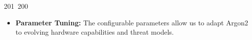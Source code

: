 201~200~\documentclass{article}
\begin{document}
\begin{itemize}
	                                                                                                                                                                                                                                                                                                	                                                                                                                                        	    	                                                                                                	                                                                                                                                                                                                                                                                                                                                	                                                                        	                                                                        	                                                                                                                                        	                                                                        \item \textbf{Parameter Tuning:} The configurable parameters allow us to adapt Argon2 to evolving hardware capabilities and threat models.
	                                                                                                                                                                                                                                                                                                	                                                                                                                                        	    	                                                                                                	                                                                                                                                                                                                                                                                                                                                	                                                                        	                                                                        	                                                                                                                                        	                                                                        \end{itemize}
\end{document}
